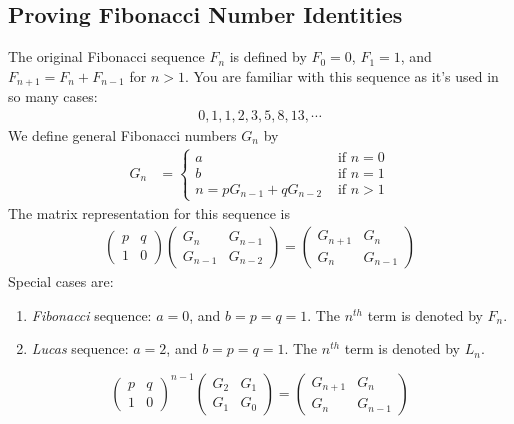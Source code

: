 \documentclass{subfile}
\begin{document}
\subsection{Proving Fibonacci Number Identities}
The original Fibonacci sequence $F_n$ is defined by $F_0=0$, $F_1=1$, and $F_{n+1} = F_{n}+F_{n-1}$ for $n>1$. You are familiar with this sequence as it's used in so many cases:
\begin{align*}
0,1,1,2,3,5,8,13,\cdots
\end{align*}
We define general Fibonacci numbers $G_n$ by
\begin{align*}
	G_{n}
		& =
			\begin{cases}
				a& \mbox{ if }n=0\\
				b& \mbox{ if }n=1\\
				n=pG_{n-1}+qG_{n-2}& \mbox{ if }n>1
			\end{cases}
\end{align*}
The matrix representation for this sequence is
\begin{align*}
\begin{pmatrix}
p & q\\
1 & 0
\end{pmatrix}
\begin{pmatrix}
G_n & G_{n-1}\\
G_{n-1} & G_{n-2}
\end{pmatrix}=
\begin{pmatrix}
G_{n+1} & G_n\\
G_n & G_{n-1}
\end{pmatrix}
\end{align*}
Special cases are:
\begin{enumerate}
\item \textit{Fibonacci} sequence: $a=0$, and $b=p=q=1$. The $n^{th}$ term is denoted by $F_n$.
\item \textit{Lucas} sequence: $a=2$, and $b=p=q=1$. The $n^{th}$ term is denoted by $L_n$.
\end{enumerate}

\begin{theorem}
\begin{equation}
\begin{pmatrix}
p & q\\
1 & 0
\end{pmatrix}^{n-1}
\begin{pmatrix}
G_2 & G_1\\
G_1 & G_0
\end{pmatrix}=
\begin{pmatrix}
G_{n+1} & G_n\\
G_n & G_{n-1}
\end{pmatrix}\label{eqn:generalfibo}
\end{equation}
\end{theorem}
\end{document}
